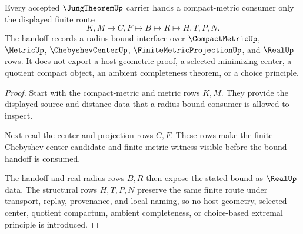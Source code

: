 \begin{theorem}
\label{thm:jung-theorem-radius-bound-handoff}
Every accepted $\JungTheoremUp$ carrier hands a compact-metric consumer only the displayed finite route
$$
K,M \longmapsto C,F \longmapsto B \longmapsto R \longmapsto H,T,P,N .
$$
The handoff records a radius-bound interface over $\CompactMetricUp$, $\MetricUp$, $\ChebyshevCenterUp$, $\FiniteMetricProjectionUp$, and $\RealUp$ rows. It does not export a host geometric proof, a selected minimizing center, a quotient compact object, an ambient completeness theorem, or a choice principle.
\end{theorem}
\begin{proof}
Start with the compact-metric and metric rows $K,M$. They provide the displayed source and distance data that a radius-bound consumer is allowed to inspect.

Next read the center and projection rows $C,F$. These rows make the finite Chebyshev-center candidate and finite metric witness visible before the bound handoff is consumed.

The handoff and real-radius rows $B,R$ then expose the stated bound as $\RealUp$ data. The structural rows $H,T,P,N$ preserve the same finite route under transport, replay, provenance, and local naming, so no host geometry, selected center, quotient compactum, ambient completeness, or choice-based extremal principle is introduced.
\end{proof}


\begin{closurestatus}{\JungTheoremUp}
  \theoryclosure{\seedClosure}
  \formalstatus{\unformalizedV}
\end{closurestatus}
